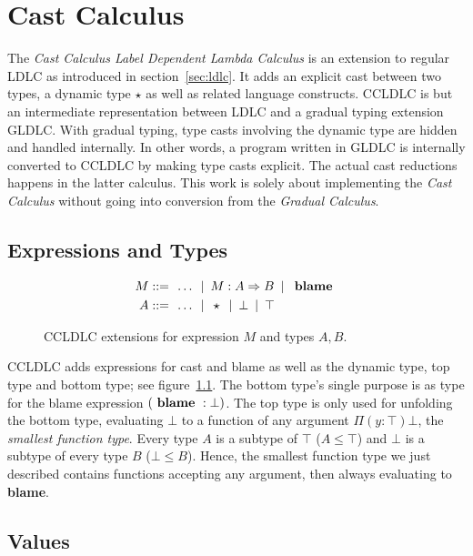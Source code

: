 \chapter{Cast Calculus}\label{chap:cast-calculus}

The \emph{Cast Calculus Label Dependent Lambda Calculus} is an extension to regular LDLC as introduced in section~\ref{sec:ldlc}. It adds an explicit cast between two types, a dynamic type $\star$ as well as related language constructs. CCLDLC is but an intermediate representation between LDLC and a gradual typing extension GLDLC. With gradual typing, type casts involving the dynamic type are hidden and handled internally. In other words, a program written in GLDLC is internally converted to CCLDLC by making type casts explicit. The actual cast reductions happens in the latter calculus. This work is solely about implementing the \emph{Cast Calculus} without going into conversion from the \emph{Gradual Calculus}.

\section{Expressions and Types}\label{sec:cc-expressions}

\begin{figure}
\begin{align*}
 M ::= & \enspace \dots \enspace|\enspace
     M : A \Rightarrow B \enspace|\enspace \text{ \textbf{blame} } \\
 A ::= & \enspace \dots \enspace|\enspace
     \star \enspace|\enspace \bot \enspace|\enspace \top
\end{align*}
\caption{CCLDLC  extensions for expression $M$ and types $A,  B$.}
\label{fig:ccldlc-extensions}
\end{figure}

CCLDLC adds expressions for cast and blame as well as the dynamic type, top type and bottom type; see figure~\ref{fig:ccldlc-extensions}.
The bottom type's single purpose is as type for the blame expression $(\text{ \textbf{blame} } : \bot)$. The top type is only used for unfolding the bottom type, evaluating $\bot$ to a function of any argument $\Pi(y:\top)\bot$, the \emph{smallest function type}. Every type $A$ is a subtype of $\top$ ($A \leq \top$) and $\bot$ is a subtype of every type $B$ ($\bot \leq B$). Hence, the smallest function type we just described contains functions accepting any argument, then always evaluating to \textbf{blame}.

\section{Values}

